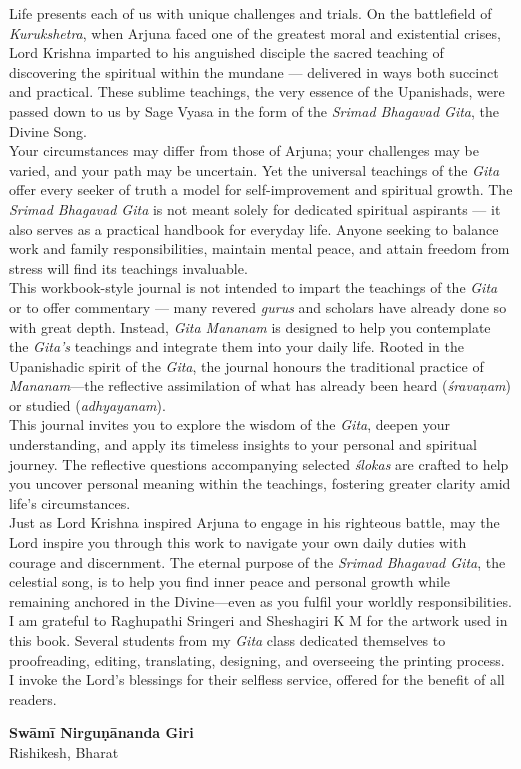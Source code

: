 {\mfontCalibri\small Life presents each of us with unique challenges and trials. On the battlefield of \emph{Kurukshetra}, when Arjuna faced one of the greatest moral and existential crises, Lord Krishna imparted to his anguished disciple the sacred teaching of discovering the spiritual within the mundane — delivered in ways both succinct and practical. These sublime teachings, the very essence of the Upanishads, were passed down to us by Sage Vyasa in the form of the \emph{Srimad Bhagavad Gita}, the Divine Song.\\

Your circumstances may differ from those of Arjuna; your challenges may be varied, and your path may be uncertain. Yet the universal teachings of the \emph{Gita} offer every seeker of truth a model for self-improvement and spiritual growth. The \emph{Srimad Bhagavad Gita} is not meant solely for dedicated spiritual aspirants — it also serves as a practical handbook for everyday life. Anyone seeking to balance work and family responsibilities, maintain mental peace, and attain freedom from stress will find its teachings invaluable.\\

This workbook-style journal is not intended to impart the teachings of the \emph{Gita} or to offer commentary — many revered \emph{gurus} and scholars have already done so with great depth. Instead, \emph{Gita Mananam} is designed to help you contemplate the \emph{Gita’s} teachings and integrate them into your daily life.
\newpage
Rooted in the Upanishadic spirit of the \emph{Gita}, the journal honours the traditional practice of \emph{Mananam}—the reflective assimilation of what has already been heard (\emph{śravaṇam}) or studied (\emph{adhyayanam}).\\

This journal invites you to explore the wisdom of the \emph{Gita}, deepen your understanding, and apply its timeless insights to your personal and spiritual journey. The reflective questions accompanying selected \emph{ślokas} are crafted to help you uncover personal meaning within the teachings, fostering greater clarity amid life’s circumstances.\\

Just as Lord Krishna inspired Arjuna to engage in his righteous battle, may the Lord inspire you through this work to navigate your own daily duties with courage and discernment. The eternal purpose of the \emph{Srimad Bhagavad Gita}, the celestial song, is to help you find inner peace and personal growth while remaining anchored in the Divine—even as you fulfil your worldly responsibilities.\\

I am grateful to Raghupathi Sringeri and Sheshagiri K M for the artwork used in this book. Several students from my \emph{Gita} class dedicated themselves to proofreading, editing, translating, designing, and overseeing the printing process. I invoke the Lord's blessings for their selfless service, offered for the benefit of all readers.\\
}

{\large\arialUC \textbf{Swāmī  Nirguṇānanda Giri}}\\
{\small{Rishikesh, Bharat}}